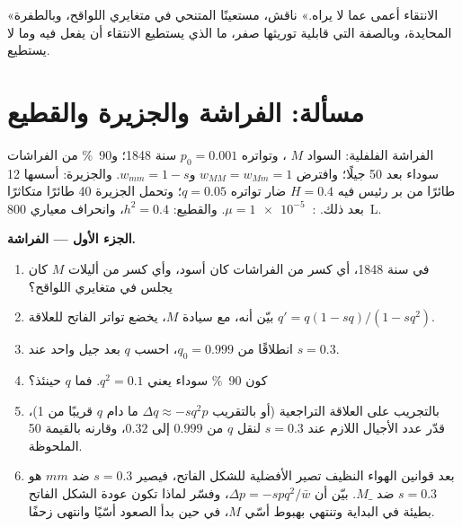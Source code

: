 \begin{exercise}[$\star\star\star$]\label{exo:b2:population-genetics:12}
«الانتقاء أعمى عما لا يراه.» ناقش، مستعينًا
 المتنحي في متغايري اللواقح، وبالطفرة المحايدة، وبالصفة
التي قابلية توريثها صفر، ما الذي يستطيع الانتقاء أن يفعل فيه وما لا
يستطيع.
\end{exercise}

\section{مسألة: الفراشة والجزيرة والقطيع}

\begin{problem}
\label{pb:b2:population-genetics:1}
الفراشة الفلفلية:  السواد $M$ ، وتواتره $p_0 = 0.001$
سنة 1848؛ و\qty{90}{\%} من الفراشات سوداء بعد 50 جيلًا؛ وافترض
$w_{MM} = w_{Mm} = 1$ و$w_{mm} = 1 - s$. والجزيرة: أسسها 12
طائرًا من بر رئيس فيه $H = 0.4$   ضار
تواتره $q = 0.05$؛ وتحمل الجزيرة 40 طائرًا متكاثرًا
بعد ذلك. : $\mu = \qty{1e-5}{}$. والقطيع: $h^{2} = 0.4$،
وانحراف معياري \qty{800}{L}.

\medskip
\noindent\textbf{الجزء الأول --- الفراشة.}
\begin{enumerate}
  \item في سنة 1848، أي كسر من الفراشات كان أسود، وأي
        كسر من أليلات $M$ كان يجلس في متغايري اللواقح؟
  \item بيّن أنه، مع سيادة $M$، يخضع تواتر 
        الفاتح للعلاقة $q' = q(1 - sq)/(1 - sq^{2})$.
  \item انطلاقًا من $q_0 = 0.999$، احسب $q$ بعد جيل واحد
        عند $s = 0.3$.
  \item كون \qty{90}{\%} سوداء يعني $q^{2} = 0.1$. فما $q$ حينئذ؟
  \item بالتجريب على العلاقة التراجعية (أو بالتقريب
        $\Delta q \approx -sq^{2}p$ ما دام $q$ قريبًا من 1)، قدّر
        عدد الأجيال اللازم عند $s = 0.3$ لنقل $q$ من $0.999$
        إلى $0.32$، وقارنه بالقيمة 50 الملحوظة.
  \item بعد قوانين الهواء النظيف تصير الأفضلية للشكل الفاتح، فيصير $s
        = 0.3$ ضد $mm$ هو $s = 0.3$ ضد $M\_$. بيّن
        أن $\Delta p = -spq^{2}/\bar w$، وفسّر لماذا تكون عودة
        الشكل الفاتح بطيئة في البداية وتنتهي بهبوط
        أسّي  $M$، في حين بدأ الصعود أسّيًا
        وانتهى زحفًا.
\end{enumerate}


\end{problem}
